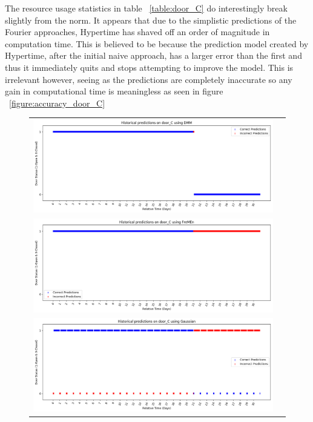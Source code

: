 The resource usage statistics in table ~\ref{table:door_C} do interestingly break slightly
from the norm. It appears that due to the simplistic predictions of the
Fourier approaches, Hypertime has shaved off an order of magnitude in
computation time. This is believed to be because the prediction model created
by Hypertime, after the initial naive approach, has a larger error than the first and thus it immediately quits
and stops attempting to improve the model. This is irrelevant however, seeing
as the predictions are completely inaccurate so any gain in computational time
is meaningless as seen in figure ~\ref{figure:accuracy_door_C}\\

\begin{center}
\begin{figure}[!Hp]
  \begin{tabular}{cc}
    {\includegraphics[width = 6in]{images/results/Historical_door_C_DMM.png}} \\
    {\includegraphics[width = 6in]{images/results/Historical_door_C_FreMEn.png}} \\
    {\includegraphics[width = 6in]{images/results/Historical_door_C_Gaussian.png}} \\

\end{tabular}
\end{figure}
\end{center}
